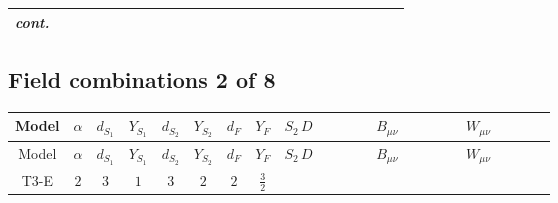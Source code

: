 \documentclass[8pt]{article}
\begin{document}
\begin{landscape}
\begin{longtable}{@{}cccccccc >{\raggedright\arraybackslash}p{0.21\linewidth} >{\raggedright\arraybackslash}p{0.21\linewidth} >{\raggedright\arraybackslash}p{0.21\linewidth}@{}}
\textit{cont.} &  &  &  &  &  &  &  & \scriptsize\adjustbox{max width=\linewidth}{$\begin{gathered} -\frac{2 \hbar  \overline{y_{1,i_1,r_1}} S_{1,j_3} S_{1,j_4} y_{1,i_1,r_1} S_{1,j_1}{}^{\dagger } S_{1,j_2}{}^{\dagger } \mathcal{I}_{S_1,j_1,j_3,j_2,j_4}{}^2 \lambda_{S_1}^{(1)}^{(2)}}{\sqrt{3} \epsilon } \\ -\frac{\hbar  \overline{y_{1,i_1,r_1}} S_{1,j_3} S_{1,j_4} y_{1,i_1,r_1} S_{1,j_1}{}^{\dagger } S_{1,j_2}{}^{\dagger } \mathcal{I}_{S_1,j_1,j_3,j_2,j_4}{}^2 \lambda_{S_1}^{(1)}^{(2)}}{\sqrt{3}}\end{gathered}$} &  & \scriptsize\adjustbox{max width=\linewidth}{$\begin{gathered} -\frac{2 \hbar  \overline{y_{2,i_1,r_1}} S_{2,j_3} S_{2,j_4} y_{2,i_1,r_1} S_{2,j_1}{}^{\dagger } S_{2,j_2}{}^{\dagger } \mathcal{I}_{S_2,j_1,j_3,j_2,j_4}{}^2 \lambda_{S_2}^{(1)}^{(2)}}{\sqrt{3} \epsilon } \\ -\frac{\hbar  \overline{y_{2,i_1,r_1}} S_{2,j_3} S_{2,j_4} y_{2,i_1,r_1} S_{2,j_1}{}^{\dagger } S_{2,j_2}{}^{\dagger } \mathcal{I}_{S_2,j_1,j_3,j_2,j_4}{}^2 \lambda_{S_2}^{(1)}^{(2)}}{\sqrt{3}}\end{gathered}$} \\
\midrule
\bottomrule
\end{longtable}
\clearpage
\subsection*{Field combinations 2 of 8}
\begin{longtable}{@{}cccccccc >{\raggedright\arraybackslash}p{0.21\linewidth} >{\raggedright\arraybackslash}p{0.21\linewidth} >{\raggedright\arraybackslash}p{0.21\linewidth}@{}}
\toprule
Model & $\alpha$ & $d_{S_1}$ & $Y_{S_1}$ & $d_{S_2}$ & $Y_{S_2}$ & $d_F$ & $Y_F$ & $S_2\,D$ & $B_{\mu\nu}$ & $W_{\mu\nu}$ \\
\midrule
\endfirsthead
\toprule
Model & $\alpha$ & $d_{S_1}$ & $Y_{S_1}$ & $d_{S_2}$ & $Y_{S_2}$ & $d_F$ & $Y_F$ & $S_2\,D$ & $B_{\mu\nu}$ & $W_{\mu\nu}$ \\
\midrule
\endhead
T3-E & $2$ & $3$ & $1$ & $3$ & $2$ & $2$ & $\frac{3}{2}$ & \scriptsize\adjustbox{max width=\linewidth}{$\begin{gathered} +D_{\mu _1}\left(S_{2,j_1}\right){}^{\dagger } D_{\mu _1}\left(S_{2,j_1}\right)\end{gathered}$} & \scriptsize\adjustbox{max width=\linewidth}{$\begin{gathered} -\frac{9 \hbar  B_{\mu _1\mu _2}^2}{2 \epsilon }\end{gathered}$} & \scriptsize\adjustbox{max width=\linewidth}{$\begin{gathered} -\frac{\hbar  \left(W_{\mu _1\mu _2}^{A_1}\right){}^2}{2 \epsilon }\end{gathered}$} \\
\midrule
\bottomrule
\end{longtable}
\clearpage

\end{landscape}
\end{document}
